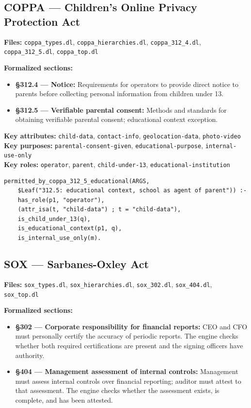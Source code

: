 \documentclass[11pt,letterpaper]{article}
\begin{document}
\begin{appendices}
\subsection{COPPA --- Children's Online Privacy Protection Act}

\textbf{Files:} \texttt{coppa\_types.dl}, \texttt{coppa\_hierarchies.dl}, \texttt{coppa\_312\_4.dl}, \texttt{coppa\_312\_5.dl}, \texttt{coppa\_top.dl}

\textbf{Formalized sections:}
\begin{itemize}
  \item \textbf{\S 312.4 --- Notice:} Requirements for operators to provide direct notice to parents before collecting personal information from children under 13.
  \item \textbf{\S 312.5 --- Verifiable parental consent:} Methods and standards for obtaining verifiable parental consent; educational context exception.
\end{itemize}

\textbf{Key attributes:} \texttt{child-data}, \texttt{contact-info}, \texttt{geolocation-data}, \texttt{photo-video}\\
\textbf{Key purposes:} \texttt{parental-consent-given}, \texttt{educational-purpose}, \texttt{internal-use-only}\\
\textbf{Key roles:} \texttt{operator}, \texttt{parent}, \texttt{child-under-13}, \texttt{educational-institution}

\begin{lstlisting}[style=soufflestyle,caption={COPPA \S 312.5 educational context exception}]
permitted_by_coppa_312_5_educational(ARGS,
    $Leaf("312.5: educational context, school as agent of parent")) :-
    has_role(p1, "operator"),
    (attr_isa(t, "child-data") ; t = "child-data"),
    is_child_under_13(q),
    is_educational_context(p1, q),
    is_internal_use_only(m).
\end{lstlisting}

\subsection{SOX --- Sarbanes-Oxley Act}

\textbf{Files:} \texttt{sox\_types.dl}, \texttt{sox\_hierarchies.dl}, \texttt{sox\_302.dl}, \texttt{sox\_404.dl}, \texttt{sox\_top.dl}

\textbf{Formalized sections:}
\begin{itemize}
  \item \textbf{\S 302 --- Corporate responsibility for financial reports:} CEO and CFO must personally certify the accuracy of periodic reports. The engine checks whether both required certifications are present and the signing officers have authority.
  \item \textbf{\S 404 --- Management assessment of internal controls:} Management must assess internal controls over financial reporting; auditor must attest to that assessment. The engine checks whether the assessment exists, is complete, and has been attested.
\end{itemize}


\end{appendices}
\end{document}
